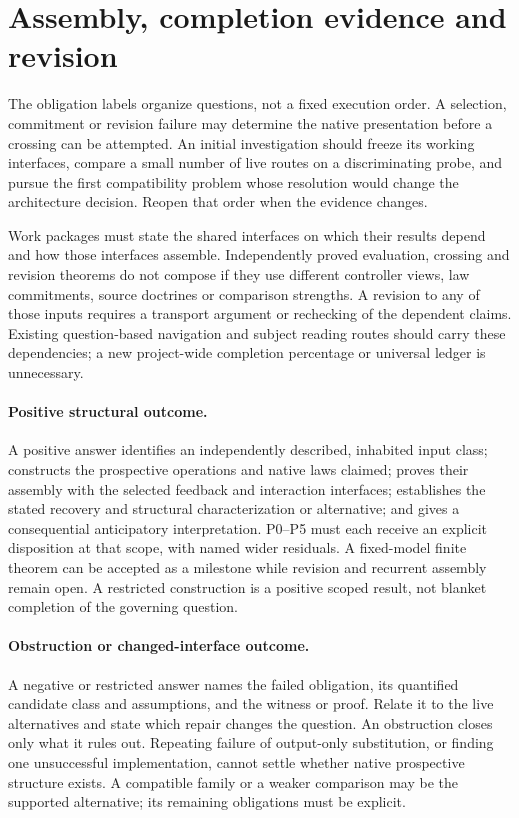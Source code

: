 \documentclass[11pt]{article}
\begin{document}
\section{Assembly, completion evidence and revision}\label{sec:completion}

The obligation labels organize questions, not a fixed execution order. A selection, commitment or revision failure may determine the native presentation before a crossing can be attempted. An initial investigation should freeze its working interfaces, compare a small number of live routes on a discriminating probe, and pursue the first compatibility problem whose resolution would change the architecture decision. Reopen that order when the evidence changes.

Work packages must state the shared interfaces on which their results depend and how those interfaces assemble. Independently proved evaluation, crossing and revision theorems do not compose if they use different controller views, law commitments, source doctrines or comparison strengths. A revision to any of those inputs requires a transport argument or rechecking of the dependent claims. Existing question-based navigation and subject reading routes should carry these dependencies; a new project-wide completion percentage or universal ledger is unnecessary.

\paragraph{Positive structural outcome.}
A positive answer identifies an independently described, inhabited input class; constructs the prospective operations and native laws claimed; proves their assembly with the selected feedback and interaction interfaces; establishes the stated recovery and structural characterization or alternative; and gives a consequential anticipatory interpretation. P0--P5 must each receive an explicit disposition at that scope, with named wider residuals. A fixed-model finite theorem can be accepted as a milestone while revision and recurrent assembly remain open. A restricted construction is a positive scoped result, not blanket completion of the governing question.

\paragraph{Obstruction or changed-interface outcome.}
A negative or restricted answer names the failed obligation, its quantified candidate class and assumptions, and the witness or proof. Relate it to the live alternatives and state which repair changes the question. An obstruction closes only what it rules out. Repeating failure of output-only substitution, or finding one unsuccessful implementation, cannot settle whether native prospective structure exists. A compatible family or a weaker comparison may be the supported alternative; its remaining obligations must be explicit.
\end{document}
